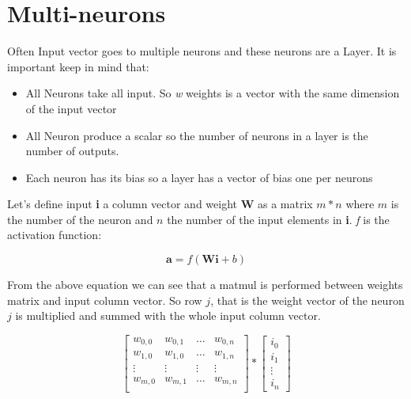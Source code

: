 \documentclass[12pt,a4paper,twoside,openright]{scrbook}
\begin{document}
\section{Multi-neurons}
Often Input vector goes to multiple neurons and these neurons are a Layer. It is important keep in mind that:
\begin{itemize}
\item All Neurons take all input. So \textit{w} weights is a vector with the same dimension of the input vector
\item All Neuron produce a scalar so the number of neurons in a layer is the number of  outputs.
\item Each neuron has its bias so a layer has a vector of bias one per neurons 
\end{itemize}

Let's define input \textbf{i} a column vector and weight \textbf{W} as a matrix $m*n$ where $m$ is the number of the neuron and $n$ the number of the input elements in \textbf{i}. \textit{f} is the activation function:

\begin{equation}
\textbf{a} = f(\textbf{W}\textbf{i} + b)
\end{equation}

From the above equation we can see that a matmul is performed between weights matrix and input column vector. So row $j$, that is the weight vector of the neuron $j$ is multiplied and summed with the whole input column vector.

\begin{equation}
  \begin{bmatrix}
w_{0,0} & w_{0,1} & \ldots & w_{0,n} \\
w_{1,0} & w_{1,0} & \ldots & w_{1,n} \\
\vdots & \vdots & \vdots & \vdots \\
w_{m,0} & w_{m,1} & \ldots & w_{m,n} \\
  \end{bmatrix} * \begin{bmatrix}
  i_0 \\ i_1 \\ \vdots \\ i_n
  \end{bmatrix}
\end{equation}
\end{document}
